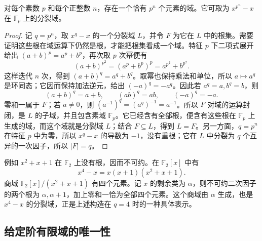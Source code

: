 \begin{theorem}\label{b1:thm:finite-field-existence}
	对每个素数 \(p\) 和每个正整数 \(n\)，存在一个恰有 \(p^n\) 个元素的域。它可取为 \(x^{p^n}-x\) 在 \(\mathbb F_p\) 上的分裂域。
\end{theorem}
\begin{proof}
	记 \(q=p^n\)，取 \(x^q-x\) 的一个分裂域 \(L\)，并令 \(F\) 为它在 \(L\) 中的根集。需要证明这些根在域运算下仍然是根，才能把根集看成一个域。特征 \(p\) 下二项式展开给出 \((a+b)^p=a^p+b^p\)，再次取 \(p\) 次幂便有
	\[
		(a+b)^{p^2}=(a^p+b^p)^p=a^{p^2}+b^{p^2}.
	\]
	这样迭代 \(n\) 次，得到 \((a+b)^q=a^q+b^q\)。取幂也保持乘法和单位，所以 \(a\mapsto a^q\) 是环同态；它因而保持加法逆元，给出 \((-a)^q=-a^q\)。因此若 \(a^q=a,b^q=b\)，则
	\[
		(a+b)^q=a+b,\qquad (ab)^q=ab,\qquad (-a)^q=-a.
	\]
	零和一属于 \(F\)；若 \(a\ne0\)，则 \((a^{-1})^q=(a^q)^{-1}=a^{-1}\)。所以 \(F\) 对域的运算封闭，是 \(L\) 的子域，并且包含素域 \(\mathbb F_p\)。它已经含有全部根，便含有这些根在 \(\mathbb F_p\) 上生成的域，而这个域就是分裂域 \(L\)；结合 \(F\subseteq L\)，得到 \(L=F\)。另一方面，\(q=p^n\) 在特征 \(p\) 中为零，所以 \(x^q-x\) 的导数为 \(-1\)，没有重根；它在 \(L\) 中分裂为 \(q\) 个互异的一次因子，所以 \(|F|=q\)。
\end{proof}
例如 \(x^2+x+1\) 在 \(\mathbb F_2\) 上没有根，因而不可约。在 \(\mathbb F_2[x]\) 中有
\[
	x^4-x=x(x+1)(x^2+x+1).
\]
商域 \(\mathbb F_2[x]/(x^2+x+1)\) 有四个元素。记 \(x\) 的剩余类为 \(\alpha\)，则不可约二次因子的两个根为 \(\alpha,\alpha+1\)，加上零和一恰为全部四个元素。这个商域由 \(\alpha\) 生成，也是 \(x^4-x\) 的分裂域，正是上述构造在 \(q=4\) 时的一种具体表示。

\subsection{给定阶有限域的唯一性}
\label{b1:subsec:1701:03}

